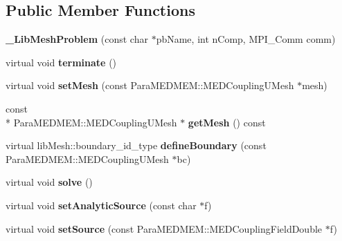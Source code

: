 \subsection*{Public Member Functions}
\begin{DoxyCompactItemize}
\item 
\hypertarget{class___lib_mesh_problem_aa8b45f543865525921a0188cdb40c722}{{\bfseries \-\_\-\-Lib\-Mesh\-Problem} (const char $\ast$pb\-Name, int n\-Comp, M\-P\-I\-\_\-\-Comm comm)}\label{class___lib_mesh_problem_aa8b45f543865525921a0188cdb40c722}

\item 
\hypertarget{class___lib_mesh_problem_ab9d4af87f97b093870adc785f070a96a}{virtual void {\bfseries terminate} ()}\label{class___lib_mesh_problem_ab9d4af87f97b093870adc785f070a96a}

\item 
\hypertarget{class___lib_mesh_problem_acc417a3f26197a4abf46b4ea4a2ccdcb}{virtual void {\bfseries set\-Mesh} (const Para\-M\-E\-D\-M\-E\-M\-::\-M\-E\-D\-Coupling\-U\-Mesh $\ast$mesh)}\label{class___lib_mesh_problem_acc417a3f26197a4abf46b4ea4a2ccdcb}

\item 
\hypertarget{class___lib_mesh_problem_aa6a56c7bca6bf8b5bc8a5da7045280aa}{const \\*
Para\-M\-E\-D\-M\-E\-M\-::\-M\-E\-D\-Coupling\-U\-Mesh $\ast$ {\bfseries get\-Mesh} () const }\label{class___lib_mesh_problem_aa6a56c7bca6bf8b5bc8a5da7045280aa}

\item 
\hypertarget{class___lib_mesh_problem_a4dc21623bffc6471b6e8597e74d0fbaa}{virtual lib\-Mesh\-::boundary\-\_\-id\-\_\-type {\bfseries define\-Boundary} (const Para\-M\-E\-D\-M\-E\-M\-::\-M\-E\-D\-Coupling\-U\-Mesh $\ast$bc)}\label{class___lib_mesh_problem_a4dc21623bffc6471b6e8597e74d0fbaa}

\item 
\hypertarget{class___lib_mesh_problem_a26f77ccf7e7b55b67a1497c43b393629}{virtual void {\bfseries solve} ()}\label{class___lib_mesh_problem_a26f77ccf7e7b55b67a1497c43b393629}

\item 
\hypertarget{class___lib_mesh_problem_aa0d625e0ce00f1324b001060d1bd37c5}{virtual void {\bfseries set\-Analytic\-Source} (const char $\ast$f)}\label{class___lib_mesh_problem_aa0d625e0ce00f1324b001060d1bd37c5}

\item 
\hypertarget{class___lib_mesh_problem_aa14caed6e73a8c173454badc3d1fec54}{virtual void {\bfseries set\-Source} (const Para\-M\-E\-D\-M\-E\-M\-::\-M\-E\-D\-Coupling\-Field\-Double $\ast$f)}\label{class___lib_mesh_problem_aa14caed6e73a8c173454badc3d1fec54}


\end{DoxyCompactItemize}
